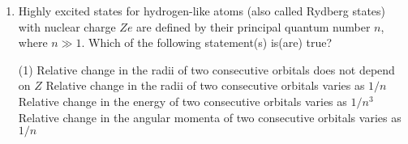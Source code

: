 
\begin{enumerate}
    \item Highly excited states for hydrogen-like atoms (also called Rydberg states) with nuclear charge \( Ze \) are defined by their principal quantum number \( n \), where \( n \gg 1 \). Which of the following statement(s) is(are) true?
        \begin{tasks}(1)
            \task Relative change in the radii of two consecutive orbitals does not depend on \( Z \)
            \task Relative change in the radii of two consecutive orbitals varies as \( 1/n \)
            \task Relative change in the energy of two consecutive orbitals varies as \( 1/n^3 \)
            \task Relative change in the angular momenta of two consecutive orbitals varies as \( 1/n \)
        \end{tasks}
\end{enumerate}

